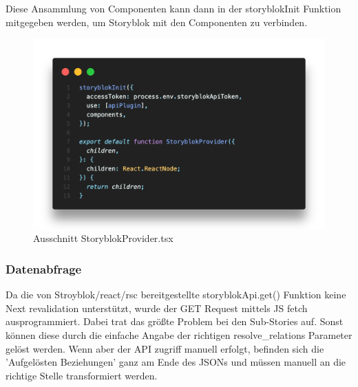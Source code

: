 Diese Ansammlung von Componenten kann dann in der storyblokInit Funktion mitgegeben werden, um Storyblok mit den Componenten zu verbinden. 

\begin{figure}[H]
    \centering
    \includegraphics[width=\linewidth]{pics/sb-provider-03.png}
    \caption{Ausschnitt StoryblokProvider.tsx}
\end{figure}

\subsubsection*{Datenabfrage}
Da die von Stroyblok/react/rsc bereitgestellte storyblokApi.get() Funktion keine Next revalidation unterstützt, wurde der GET Request mittels JS fetch ausprogrammiert. 
Dabei trat das größte Problem bei den Sub-Stories auf. 
Sonst können diese durch die einfache Angabe der richtigen resolve\_relations Parameter gelöst werden. 
Wenn aber der API zugriff manuell erfolgt, befinden sich die 'Aufgelösten Beziehungen' ganz am Ende des JSONs und müssen manuell an die richtige Stelle transformiert werden. 

